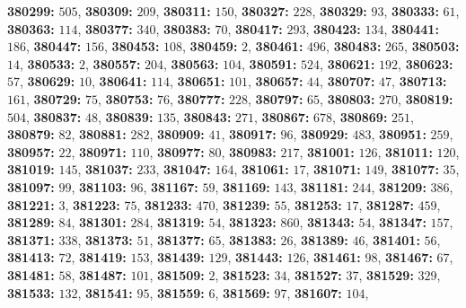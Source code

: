 \textsf{\bfseries 380299:} $505$, \textsf{\bfseries 380309:} $209$, \textsf{\bfseries 380311:} $150$, \textsf{\bfseries 380327:} $228$, \textsf{\bfseries 380329:} $93$, \textsf{\bfseries 380333:} $61$, \textsf{\bfseries 380363:} $114$, \textsf{\bfseries 380377:} $340$, \textsf{\bfseries 380383:} $70$, \textsf{\bfseries 380417:} $293$, \textsf{\bfseries 380423:} $134$, \textsf{\bfseries 380441:} $186$, \textsf{\bfseries 380447:} $156$, \textsf{\bfseries 380453:} $108$, \textsf{\bfseries 380459:} $2$, \textsf{\bfseries 380461:} $496$, \textsf{\bfseries 380483:} $265$, \textsf{\bfseries 380503:} $14$, \textsf{\bfseries 380533:} $2$, \textsf{\bfseries 380557:} $204$, \textsf{\bfseries 380563:} $104$, \textsf{\bfseries 380591:} $524$, \textsf{\bfseries 380621:} $192$, \textsf{\bfseries 380623:} $57$, \textsf{\bfseries 380629:} $10$, \textsf{\bfseries 380641:} $114$, \textsf{\bfseries 380651:} $101$, \textsf{\bfseries 380657:} $44$, \textsf{\bfseries 380707:} $47$, \textsf{\bfseries 380713:} $161$, \textsf{\bfseries 380729:} $75$, \textsf{\bfseries 380753:} $76$, \textsf{\bfseries 380777:} $228$, \textsf{\bfseries 380797:} $65$, \textsf{\bfseries 380803:} $270$, \textsf{\bfseries 380819:} $504$, \textsf{\bfseries 380837:} $48$, \textsf{\bfseries 380839:} $135$, \textsf{\bfseries 380843:} $271$, \textsf{\bfseries 380867:} $678$, \textsf{\bfseries 380869:} $251$, \textsf{\bfseries 380879:} $82$, \textsf{\bfseries 380881:} $282$, \textsf{\bfseries 380909:} $41$, \textsf{\bfseries 380917:} $96$, \textsf{\bfseries 380929:} $483$, \textsf{\bfseries 380951:} $259$, \textsf{\bfseries 380957:} $22$, \textsf{\bfseries 380971:} $110$, \textsf{\bfseries 380977:} $80$, \textsf{\bfseries 380983:} $217$, \textsf{\bfseries 381001:} $126$, \textsf{\bfseries 381011:} $120$, \textsf{\bfseries 381019:} $145$, \textsf{\bfseries 381037:} $233$, \textsf{\bfseries 381047:} $164$, \textsf{\bfseries 381061:} $17$, \textsf{\bfseries 381071:} $149$, \textsf{\bfseries 381077:} $35$, \textsf{\bfseries 381097:} $99$, \textsf{\bfseries 381103:} $96$, \textsf{\bfseries 381167:} $59$, \textsf{\bfseries 381169:} $143$, \textsf{\bfseries 381181:} $244$, \textsf{\bfseries 381209:} $386$, \textsf{\bfseries 381221:} $3$, \textsf{\bfseries 381223:} $75$, \textsf{\bfseries 381233:} $470$, \textsf{\bfseries 381239:} $55$, \textsf{\bfseries 381253:} $17$, \textsf{\bfseries 381287:} $459$, \textsf{\bfseries 381289:} $84$, \textsf{\bfseries 381301:} $284$, \textsf{\bfseries 381319:} $54$, \textsf{\bfseries 381323:} $860$, \textsf{\bfseries 381343:} $54$, \textsf{\bfseries 381347:} $157$, \textsf{\bfseries 381371:} $338$, \textsf{\bfseries 381373:} $51$, \textsf{\bfseries 381377:} $65$, \textsf{\bfseries 381383:} $26$, \textsf{\bfseries 381389:} $46$, \textsf{\bfseries 381401:} $56$, \textsf{\bfseries 381413:} $72$, \textsf{\bfseries 381419:} $153$, \textsf{\bfseries 381439:} $129$, \textsf{\bfseries 381443:} $126$, \textsf{\bfseries 381461:} $98$, \textsf{\bfseries 381467:} $67$, \textsf{\bfseries 381481:} $58$, \textsf{\bfseries 381487:} $101$, \textsf{\bfseries 381509:} $2$, \textsf{\bfseries 381523:} $34$, \textsf{\bfseries 381527:} $37$, \textsf{\bfseries 381529:} $329$, \textsf{\bfseries 381533:} $132$, \textsf{\bfseries 381541:} $95$, \textsf{\bfseries 381559:} $6$, \textsf{\bfseries 381569:} $97$, \textsf{\bfseries 381607:} $104$, 
